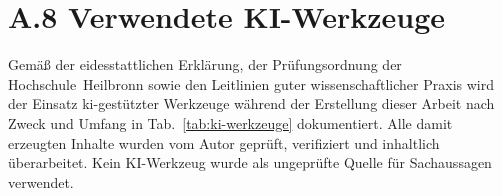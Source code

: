 \newpage
\section*{A.8 Verwendete KI-Werkzeuge}
\label{app:kiwerkzeuge}

Gemäß der eidesstattlichen Erklärung, der Prüfungsordnung der Hochschule~Heilbronn sowie den
Leitlinien guter wissenschaftlicher Praxis \cite{dfg2022codeofconduct, verch2024prompt} wird der
Einsatz \gls{ki}-gestützter Werkzeuge während der Erstellung dieser Arbeit nach Zweck und Umfang in
Tab.~\ref{tab:ki-werkzeuge} dokumentiert.
Alle damit erzeugten Inhalte wurden vom Autor geprüft, verifiziert und inhaltlich überarbeitet.
Kein KI-Werkzeug wurde als ungeprüfte Quelle für Sachaussagen verwendet.

